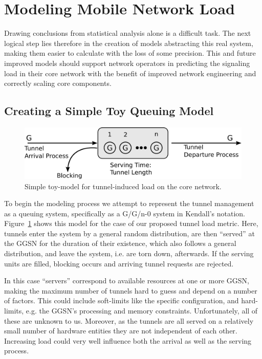 \section{Modeling Mobile Network Load}
\label{c4:sec:modeling}

Drawing conclusions from statistical analysis alone is a difficult task. The next logical step lies therefore in the creation of models abstracting this real system, making them easier to calculate with the loss of some precision. This and future improved models should support network operators in predicting the signaling load in their core network with the benefit of improved network engineering and correctly scaling core components.


\subsection{Creating a Simple Toy Queuing Model}

\begin{figure}[htbp]
	\centering
	\includegraphics[width=\columnwidth]{images/GGn-model.pdf}
	\caption{Simple toy-model for tunnel-induced load on the core network.}
	\label{c4:fig:ggn-model}
\end{figure}

To begin the modeling process we attempt to represent the tunnel management as a queuing system, specifically as a G/G/n-0 system in Kendall's notation. Figure~\ref{c4:fig:ggn-model} shows this model for the case of our proposed tunnel load metric. Here, tunnels enter the system by a general random distribution, are then ``served'' at the \ac{GGSN} for the duration of their existence, which also follows a general distribution, and leave the system, i.e. are torn down, afterwards. If the serving units are filled, blocking occurs and arriving tunnel requests are rejected.

In this case ``servers'' correspond to available resources at one or more \ac{GGSN}, making the maximum number of tunnels hard to guess and depend on a number of factors. This could include soft-limits like the specific configuration, and hard-limits, e.g. the \ac{GGSN}'s processing and memory constraints. Unfortunately, all of these are unknown to us. Moreover, as the tunnels are all served on a relatively small number of hardware entities they are not independent of each other. Increasing load could very well influence both the arrival as well as the serving process.

